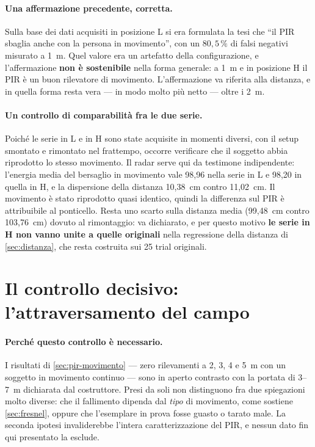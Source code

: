 \paragraph{Una affermazione precedente, corretta.} Sulla base dei dati acquisiti in
posizione L si era formulata la tesi che ``il PIR sbaglia anche con la persona in
movimento'', con un $80{,}5\,\%$ di falsi negativi misurato a 1~m. Quel valore era un
artefatto della configurazione, e l'affermazione \textbf{non è sostenibile} nella
forma generale: a 1~m e in posizione H il PIR è un buon rilevatore di movimento.
L'affermazione va riferita alla distanza, e in quella forma resta vera --- in modo
molto più netto --- oltre i 2~m.

\paragraph{Un controllo di comparabilità fra le due serie.} Poiché le serie in L e in
H sono state acquisite in momenti diversi, con il setup smontato e rimontato nel
frattempo, occorre verificare che il soggetto abbia riprodotto lo stesso movimento.
Il radar serve qui da testimone indipendente: l'energia media del bersaglio in
movimento vale 98,96 nella serie in L e 98,20 in quella in H, e la dispersione della
distanza 10,38~cm contro 11,02~cm. Il movimento è stato riprodotto quasi identico,
quindi la differenza sul PIR è attribuibile al ponticello. Resta uno scarto sulla
distanza media (99,48~cm contro 103,76~cm) dovuto al rimontaggio: va dichiarato, e
per questo motivo \textbf{le serie in H non vanno unite a quelle originali} nella
regressione della distanza di \cref{sec:distanza}, che resta costruita sui 25 trial
originali.

\section{Il controllo decisivo: l'attraversamento del campo}
\label{sec:attraversamento}

\paragraph{Perché questo controllo è necessario.} I risultati di
\cref{sec:pir-movimento} --- zero rilevamenti a 2, 3, 4 e 5~m con un soggetto in
movimento continuo --- sono in aperto contrasto con la portata di 3--7~m dichiarata
dal costruttore. Presi da soli non distinguono fra due spiegazioni molto diverse: che
il fallimento dipenda dal \emph{tipo} di movimento, come sostiene
\cref{sec:fresnel}, oppure che l'esemplare in prova fosse guasto o tarato male. La
seconda ipotesi invaliderebbe l'intera caratterizzazione del PIR, e nessun dato fin
qui presentato la esclude.

